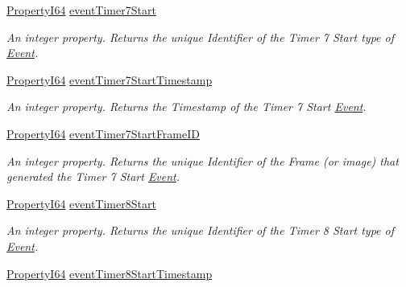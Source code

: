 \begin{DoxyCompactItemize}
\hyperlink{group___common_interface_ga81749b2696755513663492664a18a893}{Property\+I64} \hyperlink{classmv_i_m_p_a_c_t_1_1acquire_1_1_gen_i_cam_1_1_event_control_a901a6f456478fc606ac735d9107499e6}{event\+Timer7\+Start}
\begin{DoxyCompactList}\small\item\em An integer property. Returns the unique Identifier of the Timer 7 Start type of \hyperlink{classmv_i_m_p_a_c_t_1_1acquire_1_1_event}{Event}. \end{DoxyCompactList}\item 
\hyperlink{group___common_interface_ga81749b2696755513663492664a18a893}{Property\+I64} \hyperlink{classmv_i_m_p_a_c_t_1_1acquire_1_1_gen_i_cam_1_1_event_control_a8137d7df96944dc9aee63a5d3075f77d}{event\+Timer7\+Start\+Timestamp}
\begin{DoxyCompactList}\small\item\em An integer property. Returns the Timestamp of the Timer 7 Start \hyperlink{classmv_i_m_p_a_c_t_1_1acquire_1_1_event}{Event}. \end{DoxyCompactList}\item 
\hyperlink{group___common_interface_ga81749b2696755513663492664a18a893}{Property\+I64} \hyperlink{classmv_i_m_p_a_c_t_1_1acquire_1_1_gen_i_cam_1_1_event_control_aa0d1c0cb618e09321370e00f7f9fa8b6}{event\+Timer7\+Start\+Frame\+I\+D}
\begin{DoxyCompactList}\small\item\em An integer property. Returns the unique Identifier of the Frame (or image) that generated the Timer 7 Start \hyperlink{classmv_i_m_p_a_c_t_1_1acquire_1_1_event}{Event}. \end{DoxyCompactList}\item 
\hyperlink{group___common_interface_ga81749b2696755513663492664a18a893}{Property\+I64} \hyperlink{classmv_i_m_p_a_c_t_1_1acquire_1_1_gen_i_cam_1_1_event_control_ad3074f3699810be7456db69a7d8df41d}{event\+Timer8\+Start}
\begin{DoxyCompactList}\small\item\em An integer property. Returns the unique Identifier of the Timer 8 Start type of \hyperlink{classmv_i_m_p_a_c_t_1_1acquire_1_1_event}{Event}. \end{DoxyCompactList}\item 
\hyperlink{group___common_interface_ga81749b2696755513663492664a18a893}{Property\+I64} \hyperlink{classmv_i_m_p_a_c_t_1_1acquire_1_1_gen_i_cam_1_1_event_control_a365d5c871c070f33d20eab58bb73f764}{event\+Timer8\+Start\+Timestamp}

\end{DoxyCompactItemize}

